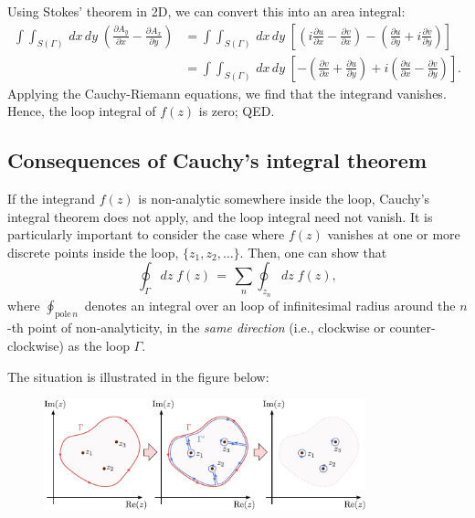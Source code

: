 \documentclass[10pt,a4paper]{article}
\begin{document}
Using Stokes' theorem in 2D, we can convert this into an area
integral:
\begin{align}
  \int\!\!\int_{S(\Gamma)}\, dx \,dy \; \left(\frac{\partial A_y}{\partial x} - \frac{\partial A_x}{\partial y}\right)
  &= \int\!\!\int_{S(\Gamma)}\, dx \,dy \; \left[\left(i\frac{\partial u}{\partial x} - \frac{\partial v}{\partial x}\right) - \left(\frac{\partial u}{\partial y} + i \frac{\partial v}{\partial y}\right)\right] \\ &= \int\!\!\int_{S(\Gamma)}\, dx \,dy \; \left[- \left(\frac{\partial v}{\partial x} + \frac{\partial u}{\partial y} \right) + i\left(\frac{\partial u}{\partial x} - \frac{\partial v}{\partial y}\right)\right].
\end{align}
Applying the Cauchy-Riemann equations, we find that the integrand
vanishes. Hence, the loop integral of $f(z)$ is zero; QED.

\subsection{Consequences of Cauchy's integral theorem}
\label{cauchy_consequence}

If the integrand $f(z)$ is non-analytic somewhere inside the loop,
Cauchy's integral theorem does not apply, and the loop integral need
not vanish. It is particularly important to consider the case where
$f(z)$ vanishes at one or more discrete points inside the loop,
$\{z_1, z_2, \dots\}$. Then, one can show that
\begin{equation}
  \oint_\Gamma dz\; f(z) \,=\, \sum_{n} \oint_{z_n} dz\; f(z),
\end{equation}
where $\oint_{\textrm{pole}\,n}$ denotes an integral over an loop of
infinitesimal radius around the $n$-th point of non-analyticity, in
the \emph{same direction} (i.e., clockwise or counter-clockwise) as
the loop $\Gamma$.

The situation is illustrated in the figure below:

\begin{figure}[h]
  \centering\includegraphics[width=0.83\textwidth]{contour_deformation}
\end{figure}
\end{document}
